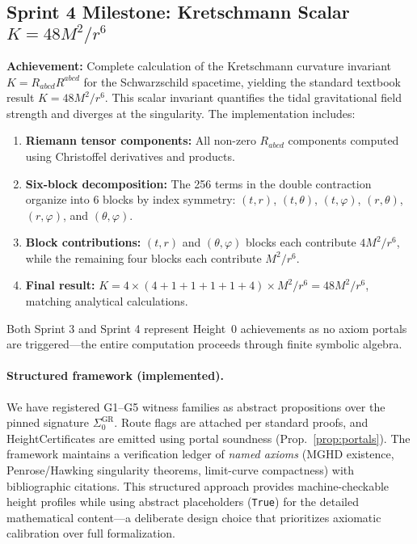 \documentclass[11pt]{article}
\theoremstyle{definition}
\theoremstyle{remark}
\begin{document}
\subsection{Sprint 4 Milestone: Kretschmann Scalar $K = 48M^2/r^6$}
\textbf{Achievement:} Complete calculation of the Kretschmann curvature invariant $K = R_{abcd}R^{abcd}$ for the Schwarzschild spacetime, yielding the standard textbook result $K = 48M^2/r^6$. This scalar invariant quantifies the tidal gravitational field strength and diverges at the singularity. The implementation includes:
\begin{enumerate}
\item \textbf{Riemann tensor components:} All non-zero $R_{abcd}$ components computed using Christoffel derivatives and products.
\item \textbf{Six-block decomposition:} The 256 terms in the double contraction organize into 6 blocks by index symmetry: $(t,r)$, $(t,\theta)$, $(t,\varphi)$, $(r,\theta)$, $(r,\varphi)$, and $(\theta,\varphi)$.
\item \textbf{Block contributions:} $(t,r)$ and $(\theta,\varphi)$ blocks each contribute $4M^2/r^6$, while the remaining four blocks each contribute $M^2/r^6$.
\item \textbf{Final result:} $K = 4 \times (4 + 1 + 1 + 1 + 1 + 4) \times M^2/r^6 = 48M^2/r^6$, matching analytical calculations.
\end{enumerate}
Both Sprint 3 and Sprint 4 represent Height~0 achievements as no axiom portals are triggered—the entire computation proceeds through finite symbolic algebra.

\paragraph{Structured framework (implemented).} We have registered G1--G5 witness families as abstract propositions over the pinned signature $\Sigma_0^{\mathrm{GR}}$. Route flags are attached per standard proofs, and HeightCertificates are emitted using portal soundness (Prop.~\ref{prop:portals}). The framework maintains a verification ledger of \emph{named axioms} (MGHD existence, Penrose/Hawking singularity theorems, limit-curve compactness) with bibliographic citations. This structured approach provides machine-checkable height profiles while using abstract placeholders (\texttt{True}) for the detailed mathematical content---a deliberate design choice that prioritizes axiomatic calibration over full formalization.
\end{document}

